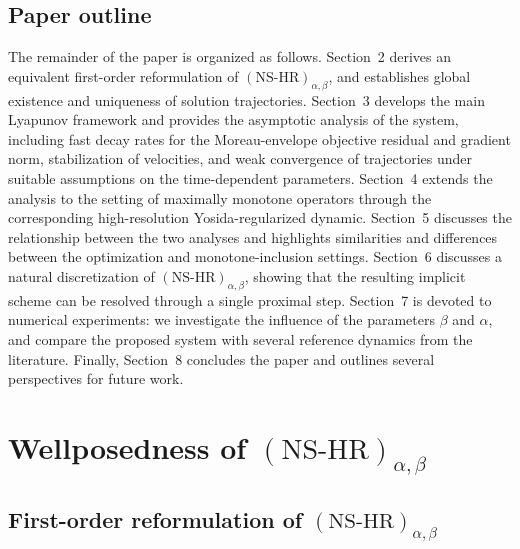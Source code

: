 \documentclass[11pt]{article}
\numberwithin{equation}{section}
\begin{document}
\subsection{Paper outline}
The remainder of the paper is organized as follows. Section~2 derives an equivalent first-order reformulation of \((\mathrm{NS\text{-}HR})_{\alpha,\beta}\), and establishes global existence and uniqueness of solution trajectories. Section~3 develops the main Lyapunov framework and provides the asymptotic analysis of the system, including fast decay rates for the Moreau-envelope objective residual and gradient norm, stabilization of velocities, and weak convergence of trajectories under suitable assumptions on the time-dependent parameters. Section~4 extends the analysis to the setting of maximally monotone operators through the corresponding high-resolution Yosida-regularized dynamic. Section~5 discusses the relationship between the two analyses and highlights similarities and differences between the optimization and monotone-inclusion settings. Section~6 discusses a natural discretization of \((\mathrm{NS\text{-}HR})_{\alpha,\beta}\), showing that the resulting implicit scheme can be resolved through a single proximal step. Section~7 is devoted to numerical experiments: we investigate the influence of the parameters \(\beta\) and \(\alpha\), and compare the proposed system with several reference dynamics from the literature.  Finally, Section~8 concludes the paper and outlines several perspectives for future work.
\section{Wellposedness of $(\text{NS-HR})_{\alpha,\beta}$}

\subsection{First-order reformulation of $(\text{NS-HR})_{\alpha,\beta}$}
\end{document}
